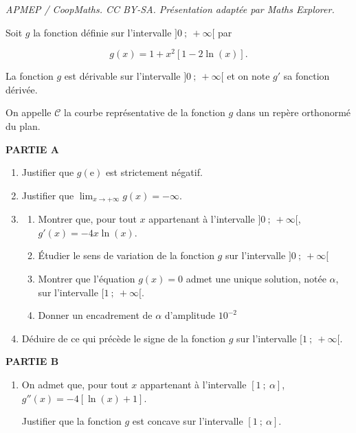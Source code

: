 \documentclass[10pt]{article}
\begin{document}
\noindent\textit{APMEP / CoopMaths. CC BY-SA. Présentation adaptée par Maths Explorer.}\par\medskip
\medskip

Soit $g$ la fonction définie sur l'intervalle $]0~;~+\infty[$ par 

\[g(x) = 1+ x^2[1 - 2 \ln (x)].\]

La fonction $g$ est dérivable sur l'intervalle $]0~;~+\infty[$ et on note $g'$ sa fonction dérivée.

On appelle $\mathcal{C}$ la courbe représentative de la fonction $g$ dans un repère orthonormé du plan.

\medskip

\textbf{PARTIE A}

\medskip

\begin{enumerate}
\item Justifier que $g(\text{e})$ est strictement négatif.
\item Justifier que $\displaystyle\lim_{x \to + \infty} g(x) = - \infty$.
\item 
	\begin{enumerate}
		\item Montrer que, pour tout $x$ appartenant à l'intervalle $]0~;~+\infty[$,\: $g'(x) = -4x \ln (x)$.
		\item Étudier le sens de variation de la fonction $g$ sur l'intervalle $]0~;~+\infty[$ 
		\item Montrer que l'équation $g(x) = 0$ admet une unique solution, notée $\alpha$, sur l'intervalle $[1~;~+\infty[$.
		\item Donner un encadrement de $\alpha$ d'amplitude $10^{-2}$
	\end{enumerate}
\item Déduire de ce qui précède le signe de la fonction $g$ sur l'intervalle $[1~;~+\infty[$.
\end{enumerate}

\medskip

\textbf{PARTIE B}

\medskip

\begin{enumerate}
\item On admet que, pour tout $x$ appartenant à l'intervalle $[1~;~\alpha]$, $g''(x) = - 4[\ln (x) + 1]$.

Justifier que la fonction $g$ est concave sur l'intervalle $[1~;~\alpha]$.
\end{enumerate}
\end{document}
